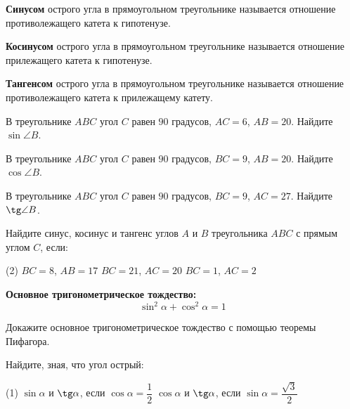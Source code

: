 %
%

\begin{class}[number=1]
	\begin{definit}
		\textbf{Синусом} острого угла в прямоугольном треугольнике называется отношение противолежащего катета к гипотенузе.
	\end{definit}
	\begin{definit}
		\textbf{Косинусом} острого угла в прямоугольном треугольнике называется отношение прилежащего катета к гипотенузе.
	\end{definit}
	\begin{definit}
		\textbf{Тангенсом} острого угла в прямоугольном треугольнике называется отношение противолежащего катета к прилежащему катету.
	\end{definit}
	\begin{listofex}
		\item В треугольнике \( ABC \) угол \( C \) равен \( 90 \) градусов, \( AC=6 \), \( AB=20 \). Найдите \( \sin\angle B \).
		\item  В треугольнике \( ABC \) угол \( C \) равен \( 90 \) градусов, \( BC=9 \), \( AB=20 \). Найдите \( \cos\angle B \).
		\item В треугольнике \( ABC \) угол \( C \) равен \( 90 \) градусов, \( BC=9 \), \( AC=27 \). Найдите \( \tg\angle B \).
		\item Найдите синус, косинус и тангенс углов \( A \) и \( B \) треугольника \( ABC \) с прямым углом \( C \), если:
		\begin{tasks}(2)
			\task \( BC=8 \), \( AB=17 \)
			\task \( BC=21 \), \( AC=20 \)
			\task \( BC=1 \), \( AC=2 \)
		\end{tasks}
		\end{listofex}
		\begin{definit}
		\textbf{Основное тригонометрическое тождество:} \[\sin^2\alpha+\cos^2\alpha=1\]
		\end{definit}
		\begin{listofex}[resume]
		\item Докажите основное тригонометрическое тождество с помощью теоремы Пифагора.
		\item Найдите, зная, что угол острый:
		\begin{tasks}(1)
			\task \( \sin\alpha \) и \( \tg\alpha \), если \( \cos\alpha=\dfrac{1}{2} \)
			\task \( \cos\alpha \) и \( \tg\alpha \), если \( \sin\alpha=\dfrac{\sqrt{3}}{2} \)
		\end{tasks}

\end{listofex}
\end{class}
